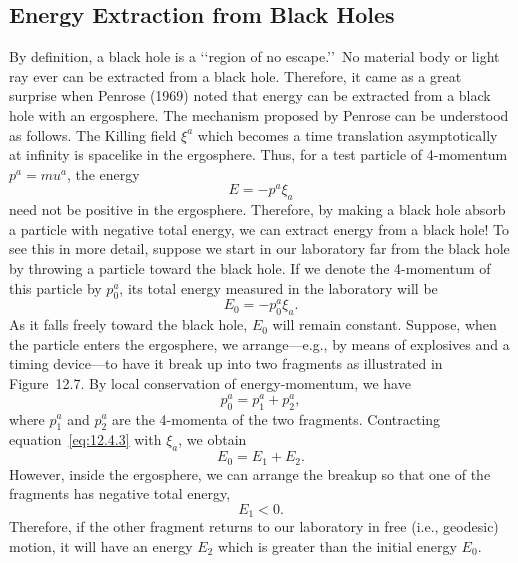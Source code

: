 
\subsection{Energy Extraction from Black Holes}\label{sec:12.4}
\setcounter{theorem}{0}

By definition, a black hole is a \lq\lq region of no escape.\rq\rq\ No material body or
light ray ever can be extracted from a black hole. Therefore, it came as a great
surprise when Penrose (1969) noted that energy can be extracted from a black hole
with an ergosphere. The mechanism proposed by Penrose can be understood as
follows. The Killing field \(\xi^a\) which becomes a time translation asymptotically
at infinity is spacelike in the ergosphere. Thus, for a test particle of 4-momentum
\(p^a=mu^a\), the energy
\begin{equation}
 E=-p^a\xi_a
 \tag{12.4.1}\label{eq:12.4.1}
\end{equation}
need not be positive in the ergosphere. Therefore, by making a black hole absorb a
particle with negative total energy, we can extract energy from a black hole! To see
this in more detail, suppose we start in our laboratory far from the black hole by
throwing a particle toward the black hole. If we denote the 4-momentum of this
particle by \(p_0^a\), its total energy measured in the laboratory will be
\begin{equation}
 E_0=-p_0^a\xi_a .
 \tag{12.4.2}\label{eq:12.4.2}
\end{equation}
As it falls freely toward the black hole, \(E_0\) will remain constant. Suppose,
when the particle enters the ergosphere, we arrange---e.g., by means of explosives
and a timing device---to have it break up into two fragments as illustrated in
Figure~12.7. By local conservation of energy-momentum, we have
\begin{equation}
 p_0^a=p_1^a+p_2^a ,
 \tag{12.4.3}\label{eq:12.4.3}
\end{equation}
where \(p_1^a\) and \(p_2^a\) are the 4-momenta of the two fragments. Contracting
equation~\eqref{eq:12.4.3} with \(\xi_a\), we obtain
\begin{equation}
 E_0=E_1+E_2 .
 \tag{12.4.4}\label{eq:12.4.4}
\end{equation}
However, inside the ergosphere, we can arrange the breakup so that one of the
fragments has negative total energy,
\begin{equation}
 E_1<0 .
 \tag{12.4.5}\label{eq:12.4.5}
\end{equation}
Therefore, if the other fragment returns to our laboratory in free (i.e., geodesic)
motion, it will have an energy \(E_2\) which is greater than the initial energy \(E_0\).

